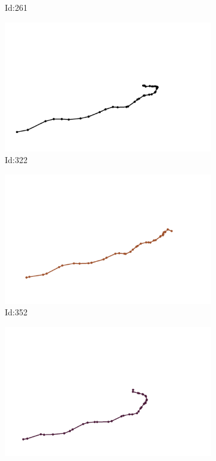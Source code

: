 \documentclass[12pt,twoside]{report}
\begin{document}
\begin{figure}
\begin{subfigure}[b]{0.20\textwidth}
\caption{Id:261}
\end{subfigure}
\begin{subfigure}[b]{0.20\textwidth}
\centering
\includegraphics[width=\textwidth]{../trajectories/322.png}
\caption{Id:322}
\end{subfigure}
\begin{subfigure}[b]{0.20\textwidth}
\centering
\includegraphics[width=\textwidth]{../trajectories/352.png}
\caption{Id:352}
\end{subfigure}
\begin{subfigure}[b]{0.20\textwidth}
\centering
\includegraphics[width=\textwidth]{../trajectories/386.png}

\end{subfigure}
\end{figure}
\end{document}
